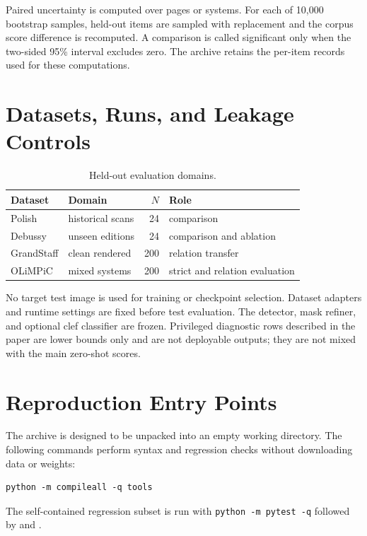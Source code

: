 \documentclass[letterpaper]{article}
\begin{document}
Paired uncertainty is computed over pages or systems. For each of 10,000 bootstrap samples, held-out items are sampled with replacement and the corpus score difference is recomputed. A comparison is called significant only when the two-sided 95\% interval excludes zero. The archive retains the per-item records used for these computations.

\section{Datasets, Runs, and Leakage Controls}
\begin{table}[h]
\centering
\footnotesize
\setlength{\tabcolsep}{3pt}
\begin{tabular}{@{}p{}p{}rp{}@{}}
\toprule
Dataset & Domain & $N$ & Role \\
\midrule
Polish & historical scans & 24 & comparison \\
Debussy & unseen editions & 24 & comparison and ablation \\
GrandStaff & clean rendered & 200 & relation transfer \\
OLiMPiC & mixed systems & 200 & strict and relation evaluation \\
\bottomrule
\end{tabular}
\caption{Held-out evaluation domains.}
\end{table}

No target test image is used for training or checkpoint selection. Dataset adapters and runtime settings are fixed before test evaluation. The detector, mask refiner, and optional clef classifier are frozen. Privileged diagnostic rows described in the paper are lower bounds only and are not deployable outputs; they are not mixed with the main zero-shot scores.

\section{Reproduction Entry Points}
The archive is designed to be unpacked into an empty working directory. The following commands perform syntax and regression checks without downloading data or weights:
\begin{verbatim}
python -m compileall -q tools
\end{verbatim}
The self-contained regression subset is run with \texttt{python -m pytest -q} followed by  and .
\end{document}
